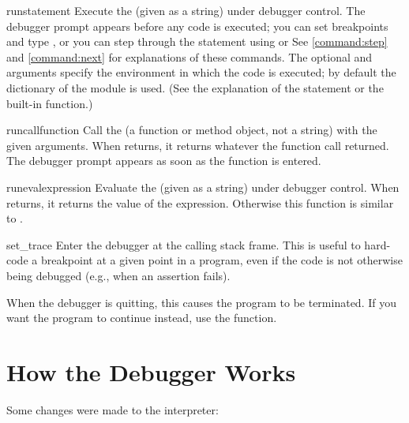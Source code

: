 \begin{funcdesc}{run}{statement}
Execute the  (given as a string) under debugger
control.  The debugger prompt appears before any code is executed; you
can set breakpoints and type , or you can step through
the statement using  or  See \ref{command:step}
and \ref{command:next} for explanations of these commands.  The
optional  and  arguments specify the
environment in which the code is executed; by default the dictionary
of the module  is used.  (See the
explanation of the  statement or the 
built-in function.)
\end{funcdesc}

\begin{funcdesc}{runcall}{function}
Call the  (a function or method object, not a string)
with the given arguments.  When  returns, it returns
whatever the function call returned.  The debugger prompt appears as
soon as the function is entered.
\end{funcdesc}

\begin{funcdesc}{runeval}{expression}
Evaluate the  (given as a string) under debugger
control.  When  returns, it returns the value of the
expression.  Otherwise this function is similar to
.
\end{funcdesc}

\begin{funcdesc}{set_trace}{}
Enter the debugger at the calling stack frame.  This is useful to
hard-code a breakpoint at a given point in a program, even if the code
is not otherwise being debugged (e.g., when an assertion fails).

When the debugger is quitting, this causes the program to be
terminated. If you want the program to continue instead, use the
 function.

\end{funcdesc}

\section{How the Debugger Works \label{debugger-hooks}}

Some changes were made to the interpreter:

